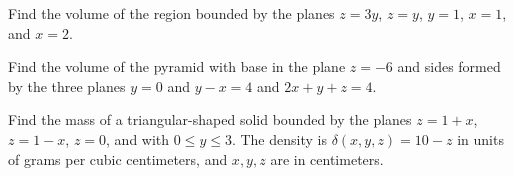 \documentclass[12pt,reqno]{amsart}
\begin{document}
\bigskip
\prob Find the volume of the region bounded by the planes $z=3y$, $z=y$, $y=1$, $x=1$, and $x=2$.

\vfill
\prob Find the volume of the pyramid with base in the plane $z=-6$ and sides formed by the three planes $y=0$ and $y-x=4$ and $2x+y+z=4$.

\vfill
\newpage
\prob Find the mass of a triangular-shaped solid bounded by the planes $z=1+x$, $z=1-x$, $z=0$, and with $0 \leq y \leq 3$. The density is $\delta(x,y,z)=10-z$ in units of grams per cubic centimeters, and $x,y,z$ are in centimeters.
\end{document}
